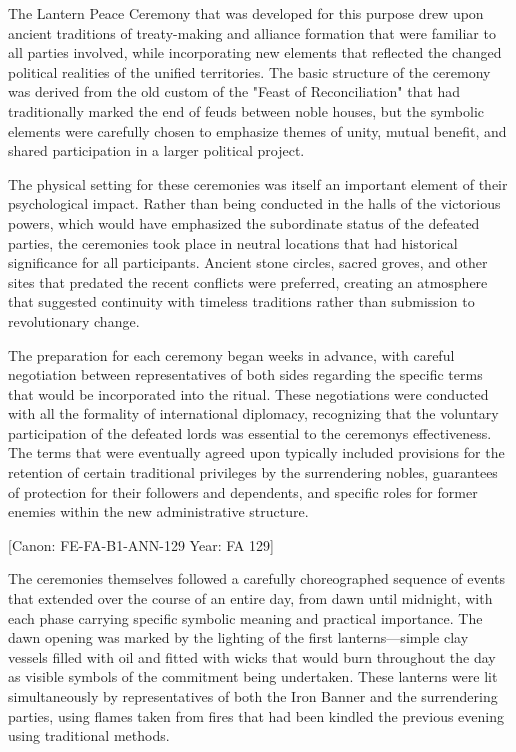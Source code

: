 The Lantern Peace Ceremony that was developed for this purpose drew upon
ancient traditions of treaty-making and alliance formation that were
familiar to all parties involved, while incorporating new elements that
reflected the changed political realities of the unified territories.
The basic structure of the ceremony was derived from the old custom of
the "Feast of Reconciliation" that had traditionally marked the end of
feuds between noble houses, but the symbolic elements were carefully
chosen to emphasize themes of unity, mutual benefit, and shared
participation in a larger political project.

The physical setting for these ceremonies was itself an important
element of their psychological impact. Rather than being conducted in
the halls of the victorious powers, which would have emphasized the
subordinate status of the defeated parties, the ceremonies took place in
neutral locations that had historical significance for all participants.
Ancient stone circles, sacred groves, and other sites that predated the
recent conflicts were preferred, creating an atmosphere that suggested
continuity with timeless traditions rather than submission to
revolutionary change.

The preparation for each ceremony began weeks in advance, with careful
negotiation between representatives of both sides regarding the specific
terms that would be incorporated into the ritual. These negotiations
were conducted with all the formality of international diplomacy,
recognizing that the voluntary participation of the defeated lords was
essential to the ceremony\textquotesingle s effectiveness. The terms
that were eventually agreed upon typically included provisions for the
retention of certain traditional privileges by the surrendering nobles,
guarantees of protection for their followers and dependents, and
specific roles for former enemies within the new administrative
structure.

{[}Canon: FE-FA-B1-ANN-129 \textbar{} Year: FA 129{]}

The ceremonies themselves followed a carefully choreographed sequence of
events that extended over the course of an entire day, from dawn until
midnight, with each phase carrying specific symbolic meaning and
practical importance. The dawn opening was marked by the lighting of the
first lanterns---simple clay vessels filled with oil and fitted with
wicks that would burn throughout the day as visible symbols of the
commitment being undertaken. These lanterns were lit simultaneously by
representatives of both the Iron Banner and the surrendering parties,
using flames taken from fires that had been kindled the previous evening
using traditional methods.

